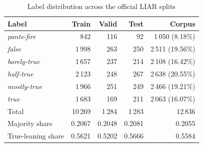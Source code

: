 \begin{table}[t]
\caption{Label distribution across the official LIAR splits}
\label{tab:splits}
\centering
\footnotesize
\begin{tabular}{@{}lrrrr@{}}
\toprule
Label & Train & Valid & Test & Corpus \\
\midrule
\emph{pants-fire}  &   842 & 116 &  92 & 1\,050 \;(8.18\%) \\
\emph{false}       & 1\,998 & 263 & 250 & 2\,511 \;(19.56\%) \\
\emph{barely-true} & 1\,657 & 237 & 214 & 2\,108 \;(16.42\%) \\
\emph{half-true}   & 2\,123 & 248 & 267 & 2\,638 \;(20.55\%) \\
\emph{mostly-true} & 1\,966 & 251 & 249 & 2\,466 \;(19.21\%) \\
\emph{true}        & 1\,683 & 169 & 211 & 2\,063 \;(16.07\%) \\
\midrule
Total              & 10\,269 & 1\,284 & 1\,283 & 12\,836 \\
Majority share     & 0.2067 & 0.2048 & 0.2081 & 0.2055 \\
True-leaning share & 0.5621 & 0.5202 & 0.5666 & 0.5584 \\
\bottomrule
\end{tabular}
\end{table}
